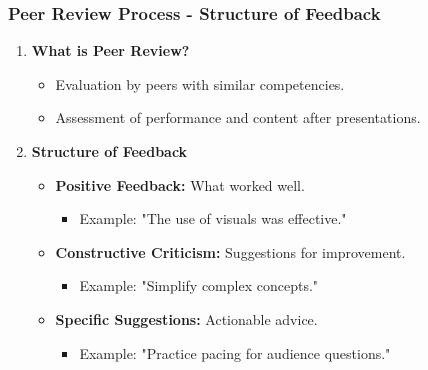\documentclass{beamer}
\begin{document}
\begin{frame}[fragile]
    \frametitle{Peer Review Process - Structure of Feedback}
    \begin{enumerate}
        \item \textbf{What is Peer Review?}
        \begin{itemize}
            \item Evaluation by peers with similar competencies.
            \item Assessment of performance and content after presentations.
        \end{itemize}
        
        \item \textbf{Structure of Feedback}
        \begin{itemize}
            \item \textbf{Positive Feedback:} What worked well.
                \begin{itemize}
                    \item Example: "The use of visuals was effective."
                \end{itemize}
            \item \textbf{Constructive Criticism:} Suggestions for improvement.
                \begin{itemize}
                    \item Example: "Simplify complex concepts."
                \end{itemize}
            \item \textbf{Specific Suggestions:} Actionable advice.
                \begin{itemize}
                    \item Example: "Practice pacing for audience questions."
                \end{itemize}
        \end{itemize}
    \end{enumerate}
\end{frame}
\end{document}

